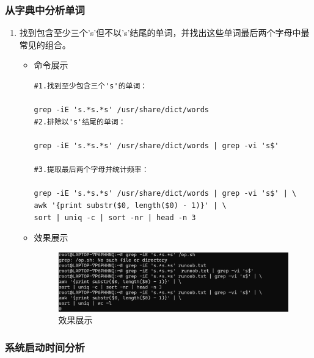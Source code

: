 \documentclass[UTF8]{ctexart}
\begin{document}
\subsubsection{从字典中分析单词}

\begin{enumerate}
  \item 找到包含至少三个's'但不以's'结尾的单词，并找出这些单词最后两个字母中最常见的组合。
  \begin{itemize}
  \item 命令展示
  \begin{verbatim}
#1.找到至少包含三个's'的单词：

grep -iE 's.*s.*s' /usr/share/dict/words
#2.排除以's'结尾的单词：

grep -iE 's.*s.*s' /usr/share/dict/words | grep -vi 's$'

#3.提取最后两个字母并统计频率：

grep -iE 's.*s.*s' /usr/share/dict/words | grep -vi 's$' | \
awk '{print substr($0, length($0) - 1)}' | \
sort | uniq -c | sort -nr | head -n 3

  \end{verbatim}

  \item 效果展示
  \begin{figure}[H]
    \centering
    \includegraphics[width=\textwidth]{31} %
    \caption{效果展示}
  
  \end{figure}
\end{itemize}
\end{enumerate}


\subsubsection{系统启动时间分析}
\end{document}
